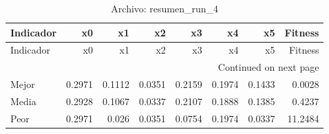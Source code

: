 \begin{longtable}{lrrrrrrr}
\caption{Archivo: resumen\_run\_4}\label{tab:resumen_run_4} \\
\toprule
Indicador & x0 & x1 & x2 & x3 & x4 & x5 & Fitness \\
\midrule
\endfirsthead
\toprule
Indicador & x0 & x1 & x2 & x3 & x4 & x5 & Fitness \\
\midrule
\endhead
\midrule
\multicolumn{8}{r}{Continued on next page} \\
\midrule
\endfoot
\bottomrule
\endlastfoot
Mejor & 0.2971 & 0.1112 & 0.0351 & 0.2159 & 0.1974 & 0.1433 & 0.0028 \\
Media & 0.2928 & 0.1067 & 0.0337 & 0.2107 & 0.1888 & 0.1385 & 0.4237 \\
Peor & 0.2971 & 0.026 & 0.0351 & 0.0754 & 0.1974 & 0.0337 & 11.2484 \\
\end{longtable}